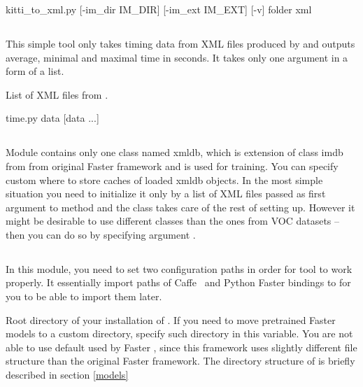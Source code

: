 \begin{usage}
kitti_to_xml.py [-im_dir IM_DIR] [-im_ext IM_EXT] [-v] folder xml
\end{usage}

\subsection{} \label{tme}
This simple tool only takes timing data from XML files produced by \hyperref[rec]{} and outputs average, minimal and maximal time in seconds. It takes only one argument in a form of a list.

\begin{description}
 List of XML files from \hyperref[rec]{}.
\end{description}

\begin{usage}
time.py data [data ...]
\end{usage}

\subsection{} \label{xml}
Module  contains only one class named xmldb, which is extension of class imdb from  from original Faster \rcnn framework and is used for training. You can specify custom  where to store caches of loaded xmldb objects. In the most simple situation you need to initialize it only by a list of XML files passed as first argument to  method and the class takes care of the rest of setting up. However it might be desirable to use different classes than the ones from VOC datasets -- then you can do so by specifying argument .

\subsection{} \label{init}
In this module, you need to set two configuration paths in order for tool \hyperref[rec]{} to work properly. It essentially import paths of Caffe~\cite{caffe} and Python Faster \rcnn bindings to  for you to be able to import them later.

\begin{description}
 Root directory of your installation of .
 If you need to move pretrained Faster \rcnn models to a custom directory, specify such directory in this variable. You are not able to use default  used by Faster \rcnn, since this framework uses slightly different file structure than the original Faster \rcnn framework. The directory structure of  is briefly described in section \ref{models}
\end{description}

